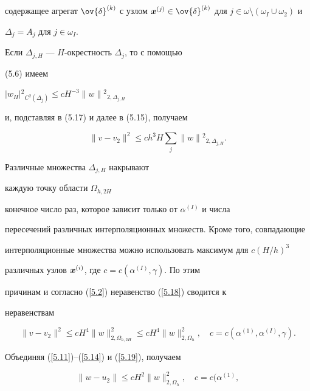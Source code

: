 \begin{pf}
содержащее агрегат $\ov{\delta}\up k$ с узлом ${\bi x}\up


j\in\ov{\delta}\up k$ для $j\in \omega\setminus (\omega_I\cup\omega_2)$ и


$\Delta_j= A_j$ для $j\in\omega_I$.





Если $\Delta_{j,H}$ --- $H$-окрестность $\Delta_j$, то с помощью


(5.6) имеем


$|w_H|{^2}_{{C^2(\Delta_j)}}\le cH^{-3}\|w\|{^2}_{{2,\Delta_{j,H}}}$


и, подставляя в (5.17) и далее в (5.15), получаем


\begin{equation}\label{5.18}


\|v-v_2\|^2\le ch^3 H\sum_j\|w\|{^2}_{{2,\Delta_{j,H}}}.


\end{equation}


Различные множества $\Delta_{j,H}$ накрывают


каждую точку области $\Omega_{h,2H}$


конечное число раз, которое зависит только от $\alpha^{(I)}$ и числа


пересечений различных интерполяционных множеств. Кроме того, совпадающие


интерполяционные множества можно использовать максимум для $c(H/h)^3$


различных узлов ${\boldsymbol x}^{(i)}$, где $c=c(\alpha^{(I)}, \gamma)$. По этим


причинам и согласно (\ref{5.2}) неравенство (\ref{5.18}) сводится к


неравенствам


\begin{equation}\label{5.19}


\|v-v_2\|^2\le cH^4\|w\|^2_{{2,\Omega_{h, 2H}}}\le


cH^4\|w\|^2_{{2,\Omega_h}},\quad


c=c(\alpha^{(1)}, \alpha^{(I)}, \gamma).


\end{equation}


Объединяя (\ref{5.11})--(\ref{5.14}) и (\ref{5.19}), получаем


\begin{equation}\label{5.20}


\|w-u_2\|\le cH^2\|w\|^2_{2,\Omega_h},\quad c=c(\alpha^{(1)},



\end{equation}
\end{pf}
